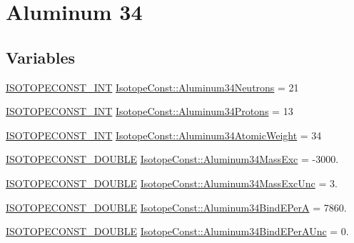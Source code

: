 \hypertarget{group___isotope_const-_aluminum-_al34}{}\section{Aluminum 34}
\label{group___isotope_const-_aluminum-_al34}
\subsection*{Variables}
\begin{DoxyCompactItemize}
\item 
\mbox{\hyperlink{group___isotope_const-_macros_ga5f18360b3e99483a35c32d789e62621c}{I\+S\+O\+T\+O\+P\+E\+C\+O\+N\+S\+T\+\_\+\+I\+NT}} \mbox{\hyperlink{group___isotope_const-_aluminum-_al34_ga9a9e3f52482bb2b2a592e910a7a6a2fe}{Isotope\+Const\+::\+Aluminum34\+Neutrons}} = 21
\item 
\mbox{\hyperlink{group___isotope_const-_macros_ga5f18360b3e99483a35c32d789e62621c}{I\+S\+O\+T\+O\+P\+E\+C\+O\+N\+S\+T\+\_\+\+I\+NT}} \mbox{\hyperlink{group___isotope_const-_aluminum-_al34_gad10ebc4275253697f0fc5d282fd31bd5}{Isotope\+Const\+::\+Aluminum34\+Protons}} = 13
\item 
\mbox{\hyperlink{group___isotope_const-_macros_ga5f18360b3e99483a35c32d789e62621c}{I\+S\+O\+T\+O\+P\+E\+C\+O\+N\+S\+T\+\_\+\+I\+NT}} \mbox{\hyperlink{group___isotope_const-_aluminum-_al34_ga0c69a64663f66fc1c9231261a8279123}{Isotope\+Const\+::\+Aluminum34\+Atomic\+Weight}} = 34
\item 
\mbox{\hyperlink{group___isotope_const-_macros_ga8f45a7272ce02c0b4c65c44636ed719a}{I\+S\+O\+T\+O\+P\+E\+C\+O\+N\+S\+T\+\_\+\+D\+O\+U\+B\+LE}} \mbox{\hyperlink{group___isotope_const-_aluminum-_al34_ga94578f7b17ceed14c9016401747b8a04}{Isotope\+Const\+::\+Aluminum34\+Mass\+Exc}} = -\/3000.
\item 
\mbox{\hyperlink{group___isotope_const-_macros_ga8f45a7272ce02c0b4c65c44636ed719a}{I\+S\+O\+T\+O\+P\+E\+C\+O\+N\+S\+T\+\_\+\+D\+O\+U\+B\+LE}} \mbox{\hyperlink{group___isotope_const-_aluminum-_al34_ga8a93d8df3b2d20cbdd15d4e8ef8bff64}{Isotope\+Const\+::\+Aluminum34\+Mass\+Exc\+Unc}} = 3.
\item 
\mbox{\hyperlink{group___isotope_const-_macros_ga8f45a7272ce02c0b4c65c44636ed719a}{I\+S\+O\+T\+O\+P\+E\+C\+O\+N\+S\+T\+\_\+\+D\+O\+U\+B\+LE}} \mbox{\hyperlink{group___isotope_const-_aluminum-_al34_ga7f9e97dcd5a95e1f482be18128a97454}{Isotope\+Const\+::\+Aluminum34\+Bind\+E\+PerA}} = 7860.
\item 
\mbox{\hyperlink{group___isotope_const-_macros_ga8f45a7272ce02c0b4c65c44636ed719a}{I\+S\+O\+T\+O\+P\+E\+C\+O\+N\+S\+T\+\_\+\+D\+O\+U\+B\+LE}} \mbox{\hyperlink{group___isotope_const-_aluminum-_al34_ga903caf7ec9ef95d4f0213f155ffb4d65}{Isotope\+Const\+::\+Aluminum34\+Bind\+E\+Per\+A\+Unc}} = 0.

\end{DoxyCompactItemize}
